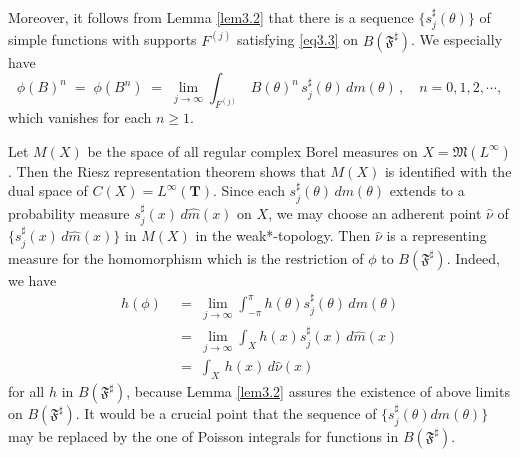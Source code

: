 \documentclass[12pt]{amsart}
\theoremstyle{plain}
\numberwithin{equation}{section}
\begin{document}
\medskip
Moreover, it follows from Lemma \ref{lem3.2} that there
is a sequence $\{s^\sharp_j(\theta)\}$ of simple functions with
supports $F^{(j)}$ satisfying \eqref{eq3.3} on $B(\mathfrak{F}^\sharp)$.
We especially have
\begin{equation}
\label{eq5.2}
\phi(B)^n \;=\;\phi(B^n)\;=\; \lim_{j \to \infty}\int_{F^{(j)}}\,
B(\theta)^n \,s^\sharp_j(\theta)\,dm(\theta)\,,\quad
n = 0, 1, 2, \cdots,
\end{equation}
which vanishes for each $n \geq 1$.

\medskip
Let $M(X)$ be the space of all regular complex Borel measures on
$X=\mathfrak{M}(L^\infty)$. Then the Riesz representation theorem
shows that $M(X)$ is identified with the dual space of
$C(X)=L^\infty(\mathbf{T})$. Since each $s^\sharp_j(\theta)\, dm(\theta)$
extends to a probability measure $s^\sharp_j(x)\,d\widehat{m}(x)$
on $X$, we may choose an adherent point $\widehat{\nu}$ of
$\{s^\sharp_j(x)\,d\widehat{m}(x)\}$ in $M(X)$ in the weak*-topology.
Then $\widehat{\nu}$ is a representing measure for the homomorphism
which is the restriction of $\phi$ to $B(\mathfrak{F}^\sharp)$.
Indeed, we have
\begin{equation}
\label{eq5.3}
\begin{aligned}
h(\phi)\;&=\; \lim_{j\to \infty} \int_{-\pi}^{\pi}
h(\theta) s^\sharp_j(\theta)\, dm(\theta)\\
&=\;\lim_{j\to \infty} \int_X
h(x) s^\sharp_j(x)\, d\widehat{m}(x)\\
&=\;\int_X\,h(x)\,d\widehat{\nu}(x)
\end{aligned}
\end{equation}
for all $h$ in $B(\mathfrak{F}^\sharp)$, because Lemma \ref{lem3.2}
assures the existence of above limits on $B(\mathfrak{F}^\sharp)$.
It would be a crucial point that the sequence of
$\{s^\sharp_j(\theta)dm(\theta)\}$ may be replaced by the one of
Poisson integrals for functions in $B(\mathfrak{F}^\sharp)$.
\end{document}
